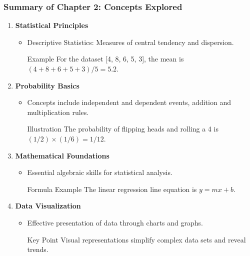 \documentclass[aspectratio=169]{beamer}
\begin{document}
\begin{frame}[fragile]
    \frametitle{Summary of Chapter 2: Concepts Explored}
    
    \begin{enumerate}
        \item \textbf{Statistical Principles}
        \begin{itemize}
            \item Descriptive Statistics: Measures of central tendency and dispersion.
            \begin{block}{Example}
                For the dataset [4, 8, 6, 5, 3], the mean is \( (4+8+6+5+3)/5 = 5.2 \).
            \end{block}
        \end{itemize}
        
        \item \textbf{Probability Basics}
        \begin{itemize}
            \item Concepts include independent and dependent events, addition and multiplication rules.
            \begin{block}{Illustration}
                The probability of flipping heads and rolling a 4 is \( (1/2) \times (1/6) = 1/12 \).
            \end{block}
        \end{itemize}

        \item \textbf{Mathematical Foundations}
        \begin{itemize}
            \item Essential algebraic skills for statistical analysis.
            \begin{block}{Formula Example}
                The linear regression line equation is \( y = mx + b \).
            \end{block}
        \end{itemize}
        
        \item \textbf{Data Visualization}
        \begin{itemize}
            \item Effective presentation of data through charts and graphs.
            \begin{block}{Key Point}
                Visual representations simplify complex data sets and reveal trends.
            \end{block}
        \end{itemize}
    \end{enumerate}
\end{frame}
\end{document}
